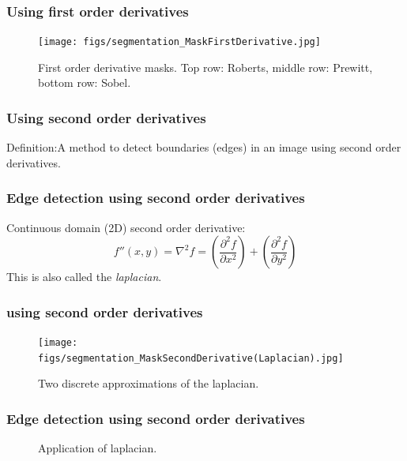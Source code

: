 \begin{frame}
\frametitle{Using first order derivatives}
\logoCSIPCPL\mypagenum
	\begin{figure}[!htp]
		\texttt{[image: figs/segmentation\_MaskFirstDerivative.jpg]}
		\caption{First order derivative masks.  Top row: Roberts, middle row: Prewitt, bottom row: Sobel.} 
		\label{fig:MaskFirstDerivative}
	\end{figure}
\end{frame}




\begin{frame}
\frametitle{Using second order derivatives}
\logoCSIPCPL\mypagenum
	\begin{block}{Definition:}A method to detect boundaries (edges) in an image using second order derivatives.
	\end{block}
\end{frame}





\begin{frame}
\frametitle{Edge detection using second order derivatives}
\logoCSIPCPL\mypagenum
Continuous domain (2D) second order derivative:
\begin{equation}\label{eqn:Cont2DSecondOrderDerivative}
f''(x,y)=\nabla^2 f = (\frac{\partial^2 f}{\partial x^2}) +
(\frac{\partial^2 f}{\partial y^2})
\end{equation}
This is also called the \emph{laplacian}.
\end{frame}



\begin{frame}
\frametitle{using second order derivatives}
\logoCSIPCPL\mypagenum
	\begin{figure}[!htp]
		\texttt{[image: figs/segmentation\_MaskSecondDerivative(Laplacian).jpg]}
		\caption{Two discrete approximations of the laplacian.}
		\label{fig:LaplacianMasks}
	\end{figure}
\end{frame}





\begin{frame}
\frametitle{Edge detection using second order derivatives}
\logoCSIPCPL\mypagenum
	\begin{figure}[!htp]
		\centering 
	    	\hspace{0.2cm}
		\caption{Application of laplacian.}
		\label{fig:ApplyingSecondOrderDerivatives}
	\end{figure}
\end{frame}





